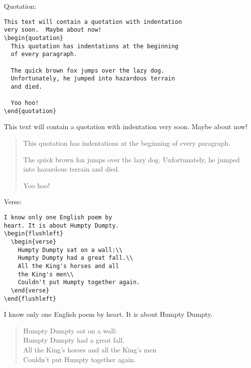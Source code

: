 \begin{framed}
  \noindent Quotation:
\begin{verbatim}
This text will contain a quotation with indentation
very soon.  Maybe about now!
\begin{quotation}
  This quotation has indentations at the beginning
  of every paragraph.

  The quick brown fox jumps over the lazy dog.
  Unfortunately, he jumped into hazardous terrain
  and died.

  Yoo hoo!
\end{quotation}
\end{verbatim}
  This text will contain a quotation with indentation very soon.
  Maybe about now!
  \begin{quotation}
    This quotation has indentations at the beginning of every
    paragraph.

    The quick brown fox jumps over the lazy dog.  Unfortunately, he
    jumped into hazardous terrain and died.

    Yoo hoo!
  \end{quotation}
\end{framed}
\begin{framed}
  \noindent Verse:
\begin{verbatim}
I know only one English poem by
heart. It is about Humpty Dumpty.
\begin{flushleft}
  \begin{verse}
    Humpty Dumpty sat on a wall:\\
    Humpty Dumpty had a great fall.\\
    All the King's horses and all
    the King's men\\
    Couldn't put Humpty together again.
  \end{verse}
\end{flushleft}
\end{verbatim}
  I know only one English poem by heart. It is about Humpty Dumpty.
  \begin{flushleft}
    \begin{verse}
      Humpty Dumpty sat on a wall:\\
      Humpty Dumpty had a great fall.\\
      All the King's horses and all
      the King's men\\
      Couldn't put Humpty together again.
    \end{verse}
  \end{flushleft}
\end{framed}

